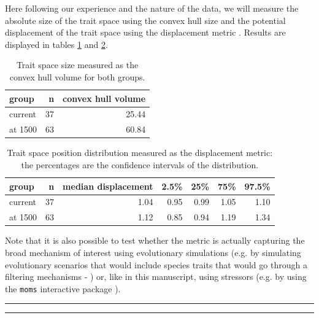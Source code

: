 \documentclass[12pt,letterpaper]{article}
\begin{document}
Here following our experience and the nature of the data, we will measure the absolute size of the trait space using the convex hull size and the potential displacement of the trait space using the displacement metric \citep{guillerme2020shifting}.
Results are displayed in tables \ref{Tab:results_convhull} and \ref{Tab:displacement}.

\begin{table}[ht]
\centering
\begin{tabular}{lrr}
  \hline
 group & n & convex hull volume \\ 
  \hline
 current &  37 & 25.44 \\ 
 at 1500 &  63 & 60.84 \\ 
   \hline
\end{tabular}
\caption{Trait space size measured as the convex hull volume for both groups.}
\label{Tab:results_convhull}
\end{table}



\begin{table}[ht]
\centering
\begin{tabular}{lrrrrrr}
  \hline
 group & n & median displacement & 2.5\% & 25\% & 75\% & 97.5\% \\ 
  \hline
 current &  37 & 1.04 & 0.95 & 0.99 & 1.05 & 1.10 \\ 
 at 1500 &  63 & 1.12 & 0.85 & 0.94 & 1.19 & 1.34 \\ 
   \hline
\end{tabular}
\caption{Trait space position distribution measured as the displacement metric: the percentages are the confidence intervals of the distribution.}
\label{Tab:displacement}
\end{table}

Note that it is also possible to test whether the metric is actually capturing the broad mechanism of interest using evolutionary simulations (e.g. by simulating evolutionary scenarios that would include species traits that would go through a filtering mechanisms - \citealt{guillerme2024treats}) or, like in this manuscript, using stressors (e.g. by using the \texttt{moms} interactive package \citealt{guillerme2020shifting}).


\bigskip
\bigskip
\hrule
\hrule
\end{document}
